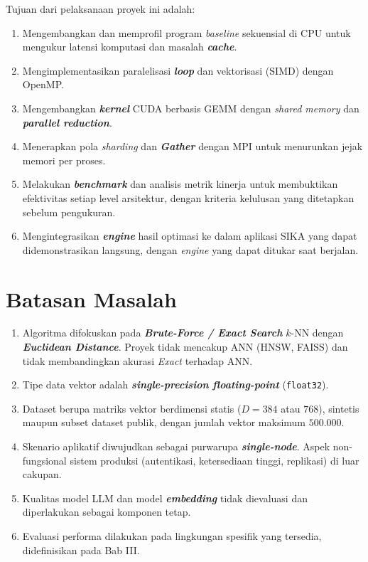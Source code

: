 \documentclass[12pt,a4paper,oneside]{report}
\newcommand{\keyword}[1]{\textbf{\textit{#1}}}
\begin{document}
Tujuan dari pelaksanaan proyek ini adalah:
\begin{enumerate}[leftmargin=2em]
  \item Mengembangkan dan memprofil program \textit{baseline} sekuensial di CPU untuk mengukur latensi komputasi dan masalah \keyword{cache}.
  \item Mengimplementasikan paralelisasi \keyword{loop} dan vektorisasi (SIMD) dengan OpenMP.
  \item Mengembangkan \keyword{kernel} CUDA berbasis GEMM dengan \textit{shared memory} dan \keyword{parallel reduction}.
  \item Menerapkan pola \textit{sharding} dan \keyword{Gather} dengan MPI untuk menurunkan jejak memori per proses.
  \item Melakukan \keyword{benchmark} dan analisis metrik kinerja untuk membuktikan efektivitas setiap level arsitektur, dengan kriteria kelulusan yang ditetapkan sebelum pengukuran.
  \item Mengintegrasikan \keyword{engine} hasil optimasi ke dalam aplikasi SIKA yang dapat didemonstrasikan langsung, dengan \textit{engine} yang dapat ditukar saat berjalan.
\end{enumerate}

\section{Batasan Masalah}

\begin{enumerate}[leftmargin=2em]
  \item Algoritma difokuskan pada \keyword{Brute-Force / Exact Search} $k$-NN dengan \keyword{Euclidean Distance}. Proyek tidak mencakup ANN (HNSW, FAISS) dan tidak membandingkan akurasi \textit{Exact} terhadap ANN.
  \item Tipe data vektor adalah \keyword{single-precision floating-point} (\texttt{float32}).
  \item Dataset berupa matriks vektor berdimensi statis ($D=384$ atau $768$), sintetis maupun subset dataset publik, dengan jumlah vektor maksimum $500.000$.
  \item Skenario aplikatif diwujudkan sebagai purwarupa \keyword{single-node}. Aspek non-fungsional sistem produksi (autentikasi, ketersediaan tinggi, replikasi) di luar cakupan.
  \item Kualitas model LLM dan model \keyword{embedding} tidak dievaluasi dan diperlakukan sebagai komponen tetap.
  \item Evaluasi performa dilakukan pada lingkungan spesifik yang tersedia, didefinisikan pada Bab III.
\end{enumerate}
\end{document}
